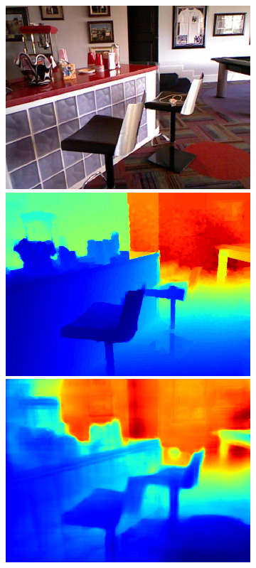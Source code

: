 \begin{figure}[htb]
\begin{subfigure}{0.15\linewidth}
  \begin{minipage}[t]{1\linewidth}
  \centering
  \includegraphics[width=1\linewidth]{figure/nyu_rgb/431.png}
  \includegraphics[width=1\linewidth]{figure/nyu_gt/431.png}
  \includegraphics[width=1\linewidth]{figure/nyu_result/playroom_rgb_00431.png}

\end{minipage}
\end{subfigure}
\end{figure}
